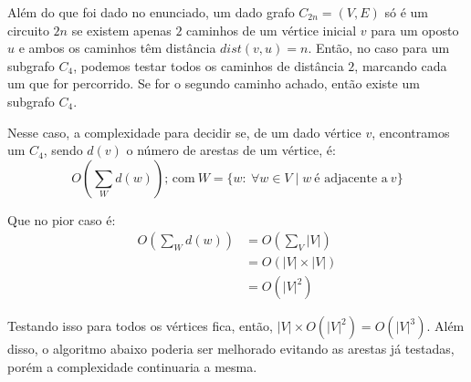 \par Além do que foi dado no enunciado, um dado grafo $C_{2n} = (V, E)$ só é um
circuito $2n$ se existem apenas $2$ caminhos de um vértice inicial $v$ para um
oposto $u$ e ambos os caminhos têm distância $dist(v, u) = n$. Então, no caso para
um subgrafo $C_4$, podemos testar todos os caminhos de distância $2$, marcando cada
um que for percorrido. Se for o segundo caminho achado, então existe um subgrafo $C_4$.

\par Nesse caso, a complexidade para decidir se, de um dado vértice $v$,
encontramos um $C_4$, sendo $d(v)$ o número de arestas de um vértice, é:
\begin{equation*}
    O\left(\sum_W d(w)\right)\text{; com}\ W = \{w:\ \forall w \in V \mid w\
    \text{é adjacente a}\ v\}
\end{equation*}
\par Que no pior caso é:
\begin{align*}
    O\left(\sum_W d(w)\right)
    &= O\left(\sum_V |V|\right) \\
    &= O\left(|V| \times |V|\right) \\
    &= O\left(|V|^2\right)
\end{align*}

\par Testando isso para todos os vértices fica, então, $|V| \times O\left(|V|^2
\right) = O\left(|V|^3\right)$. Além disso, o algoritmo abaixo poderia ser melhorado
evitando as arestas já testadas, porém a complexidade continuaria a mesma.